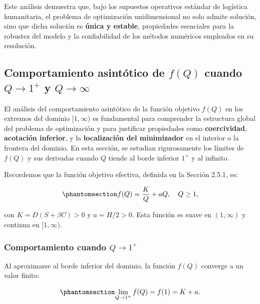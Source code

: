 \documentclass[
  spanish,
  us-letterpaper,
  DIV=11,
  numbers=noendperiod]{scrreprt}
\numberwithin{equation}{section}
\begin{document}
Este análisis demuestra que, bajo los supuestos operativos estándar de
logística humanitaria, el problema de optimización unidimensional no
solo admite solución, sino que dicha solución es \textbf{única y
estable}, propiedades esenciales para la robustez del modelo y la
confiabilidad de los métodos numéricos empleados en su resolución.

\subsection{\texorpdfstring{Comportamiento asintótico de \(f(Q)\) cuando
\(Q \to 1^+\) y
\(Q \to \infty\)}{Comportamiento asintótico de f(Q) cuando Q \textbackslash to 1\^{}+ y Q \textbackslash to \textbackslash infty}}\label{comportamiento-asintuxf3tico-de-fq-cuando-q-to-1-y-q-to-infty}

El análisis del comportamiento asintótico de la función objetivo
\(f(Q)\) en los extremos del dominio \([1, \infty)\) es fundamental para
comprender la estructura global del problema de optimización y para
justificar propiedades como \textbf{coercividad}, \textbf{acotación
inferior}, y la \textbf{localización del minimizador} en el interior o
la frontera del dominio. En esta sección, se estudian rigurosamente los
límites de \(f(Q)\) y sus derivadas cuando \(Q\) tiende al borde
inferior \(1^+\) y al infinito.

Recordemos que la función objetivo efectiva, definida en la Sección
2.5.1, es:

\begin{equation}\phantomsection\label{eq-fQ_25_4}{
f(Q) = \frac{K}{Q} + a Q,
\quad
Q \geq 1,
}\end{equation}

con \(K = D(S + \beta C) > 0\) y \(a = H/2 > 0\). Esta función es suave
en \((1, \infty)\) y continua en \([1, \infty)\).

\subsubsection{\texorpdfstring{Comportamiento cuando
\(Q \to 1^+\)}{Comportamiento cuando Q \textbackslash to 1\^{}+}}\label{comportamiento-cuando-q-to-1}

Al aproximarse al borde inferior del dominio, la función \(f(Q)\)
converge a un valor finito:

\begin{equation}\phantomsection\label{eq-lim_Q1}{
\lim_{Q \to 1^+} f(Q) = f(1) = K + a.
}\end{equation}
\end{document}
